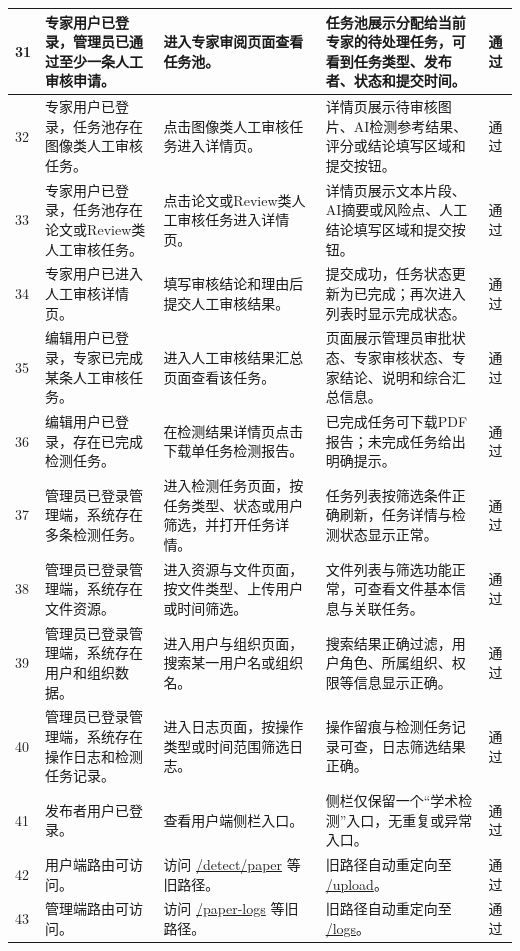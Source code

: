 \documentclass[UTF8,a4paper,12pt]{ctexart}
\newcommand{\pass}{通过}
\begin{document}
\begin{longtable}{|P{0.9cm}|P{3.5cm}|P{4.7cm}|P{5.0cm}|P{1.2cm}|}
31 & 专家用户已登录，管理员已通过至少一条人工审核申请。 & 进入专家审阅页面查看任务池。 & 任务池展示分配给当前专家的待处理任务，可看到任务类型、发布者、状态和提交时间。 & \pass \\
\hline

32 & 专家用户已登录，任务池存在图像类人工审核任务。 & 点击图像类人工审核任务进入详情页。 & 详情页展示待审核图片、AI检测参考结果、评分或结论填写区域和提交按钮。 & \pass \\
\hline

33 & 专家用户已登录，任务池存在论文或Review类人工审核任务。 & 点击论文或Review类人工审核任务进入详情页。 & 详情页展示文本片段、AI摘要或风险点、人工结论填写区域和提交按钮。 & \pass \\
\hline

34 & 专家用户已进入人工审核详情页。 & 填写审核结论和理由后提交人工审核结果。 & 提交成功，任务状态更新为已完成；再次进入列表时显示完成状态。 & \pass \\
\hline

35 & 编辑用户已登录，专家已完成某条人工审核任务。 & 进入人工审核结果汇总页面查看该任务。 & 页面展示管理员审批状态、专家审核状态、专家结论、说明和综合汇总信息。 & \pass \\
\hline

36 & 编辑用户已登录，存在已完成检测任务。 & 在检测结果详情页点击下载单任务检测报告。 & 已完成任务可下载PDF报告；未完成任务给出明确提示。 & \pass \\
\hline

37 & 管理员已登录管理端，系统存在多条检测任务。 & 进入检测任务页面，按任务类型、状态或用户筛选，并打开任务详情。 & 任务列表按筛选条件正确刷新，任务详情与检测状态显示正常。 & \pass \\
\hline

38 & 管理员已登录管理端，系统存在文件资源。 & 进入资源与文件页面，按文件类型、上传用户或时间筛选。 & 文件列表与筛选功能正常，可查看文件基本信息与关联任务。 & \pass \\
\hline

39 & 管理员已登录管理端，系统存在用户和组织数据。 & 进入用户与组织页面，搜索某一用户名或组织名。 & 搜索结果正确过滤，用户角色、所属组织、权限等信息显示正确。 & \pass \\
\hline

40 & 管理员已登录管理端，系统存在操作日志和检测任务记录。 & 进入日志页面，按操作类型或时间范围筛选日志。 & 操作留痕与检测任务记录可查，日志筛选结果正确。 & \pass \\
\hline

41 & 发布者用户已登录。 & 查看用户端侧栏入口。 & 侧栏仅保留一个“学术检测”入口，无重复或异常入口。 & \pass \\
\hline

42 & 用户端路由可访问。 & 访问 \url{/detect/paper} 等旧路径。 & 旧路径自动重定向至 \url{/upload}。 & \pass \\
\hline

43 & 管理端路由可访问。 & 访问 \url{/paper-logs} 等旧路径。 & 旧路径自动重定向至 \url{/logs}。 & \pass \\
\hline

\end{longtable}
\end{document}
